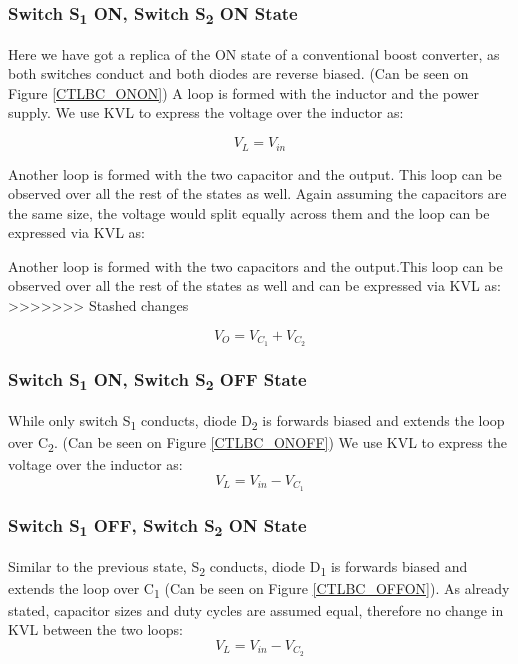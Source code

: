 \subsubsection{Switch S\textsubscript{1} ON, Switch S\textsubscript{2} ON State}
Here we have got a replica of the ON state of a conventional boost converter, as both switches conduct and both diodes are reverse biased. (Can be seen on Figure \ref{CTLBC_ONON}) A loop is formed with the inductor and the power supply. We use KVL to express the voltage over the inductor as: 

\begin{equation}
	V_{L}=V_{in}
	\label{eq:CTLBC_KVL_ONON}
\end{equation}

Another loop is formed with the two capacitor and the output. This loop can be observed over all the rest of the states as well. Again assuming the capacitors are the same size, the voltage would split equally across them and the loop can be expressed via KVL as: 

Another loop is formed with the two capacitors and the output.This loop can be observed over all the rest of the states as well and can be expressed via KVL as: 
>>>>>>> Stashed changes

\begin{equation}
	V_O=V_{C_1}+V_{C_2}
	\label{eq:CTLBC_KVL_ONON2}
\end{equation}


\subsubsection{Switch S\textsubscript{1} ON, Switch S\textsubscript{2} OFF State}
While only switch S\textsubscript{1} conducts, diode D\textsubscript{2} is forwards biased and extends the loop over C\textsubscript{2}. (Can be seen on Figure \ref{CTLBC_ONOFF}) We use KVL to express the voltage over the inductor as: 
\begin{equation}
	V_{L}=V_{in}-V_{C_1}
	\label{eq:CTLBC_KVL_ONOFF}
\end{equation}
 
\subsubsection{Switch S\textsubscript{1} OFF, Switch S\textsubscript{2} ON State}
Similar to the previous state, S\textsubscript{2} conducts, diode D\textsubscript{1} is forwards biased and extends the loop over C\textsubscript{1} (Can be seen on Figure \ref{CTLBC_OFFON}). As already stated, capacitor sizes and duty cycles are assumed equal, therefore no change in KVL between the two loops: 
\begin{equation}
	V_{L}=V_{in}-V_{C_2}
	\label{eq:CTLBC_KVL_OFFON}
\end{equation}

